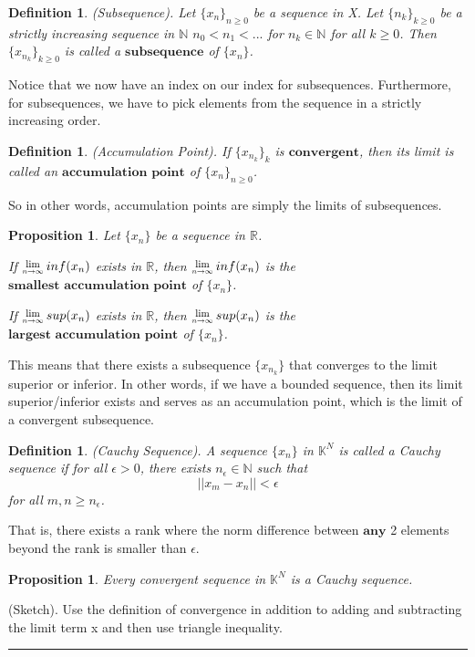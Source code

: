 \documentclass[twoside]{article}
\newcommand{\Lim}[1]{\raisebox{0.5ex}{\scalebox{0.8}{$\displaystyle \lim_{#1}\;$}}}
\newtheorem{proposition}[theorem]{Proposition}
\newtheorem{definition}[theorem]{Definition}
\newenvironment{proof}{{\bf Proof:}}{\hfill\rule{2mm}{2mm}}
\begin{document}
\begin{definition}
(Subsequence). Let $\{x_n\}_{n \geq 0}$ be a sequence in X. Let $\{n_k\}_{k \geq 0}$ be a strictly increasing sequence in $\mathbb{N}$ $n_0 < n_1 < ...$ for $n_k \in \mathbb{N}$ for all $k \geq 0$. Then $\{x_{n_k}\}_{k \geq 0}$ is called a $\textbf{subsequence}$ of $\{x_n\}$.
\end{definition}

Notice that we now have an index on our index for subsequences. Furthermore, for subsequences, we have to pick elements from the sequence in a strictly increasing order.

\begin{definition}
(Accumulation Point). If $\{x_{n_k}\}_{k}$ is $\textbf{convergent}$, then its limit is called an $\textbf{accumulation point}$ of $\{x_n\}_{n \geq 0}$.
\end{definition}

So in other words, accumulation points are simply the limits of subsequences.

\begin{proposition}
Let $\{x_n\}$ be a sequence in $\mathbb{R}$. 

If $\Lim{n\rightarrow \infty}inf(x_n)$ exists in $\mathbb{R}$, then $\Lim{n\rightarrow \infty}inf(x_n)$ is the $\textbf{smallest accumulation point}$ of $\{x_n\}$.

If $\Lim{n\rightarrow \infty}sup(x_n)$ exists in $\mathbb{R}$, then $\Lim{n\rightarrow \infty}sup(x_n)$ is the $\textbf{largest accumulation point}$ of $\{x_n\}$.
\end{proposition}

This means that there exists a subsequence $\{x_{n_k}\}$ that converges to the limit superior or inferior. In other words, if we have a bounded sequence, then its limit superior/inferior exists and serves as an accumulation point, which is the limit of a convergent subsequence.

\begin{definition}
(Cauchy Sequence). A sequence $\{x_n\}$ in $\mathbb{K}^N$ is called a Cauchy sequence if for all $\epsilon > 0$, there exists $n_{\epsilon} \in \mathbb{N}$ such that 
$$
||x_m - x_n || < \epsilon
$$
for all $m,n \geq n_{\epsilon}$.
\end{definition}
That is, there exists a rank where the norm difference between $\textbf{any}$ 2 elements beyond the rank is smaller than $\epsilon$.

\begin{proposition}
Every convergent sequence in $\mathbb{K}^N$ is a Cauchy sequence.
\end{proposition}
\begin{proof}
(Sketch). Use the definition of convergence in addition to adding and subtracting the limit term x and then use triangle inequality. 
\end{proof}
\end{document}
